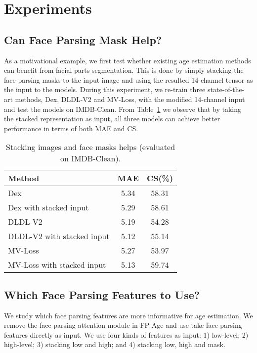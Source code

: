 \section{Experiments}
\subsection{Can Face Parsing Mask Help?}\label{sec:exp:masks}
As a motivational example, we first test whether existing age estimation methods can benefit from facial parts segmentation. This is done by simply stacking the face parsing masks to the input image and using the resulted 14-channel tensor as the input to the models. During this experiment, we re-train three state-of-the-art methods, Dex, DLDL-V2 and MV-Loss, with the modified 14-channel input and test the models on IMDB-Clean. 
From Table~\ref{tab:stack-helps} we observe that by taking the stacked representation as input, all three models can achieve better performance in terms of both MAE and CS.
\begin{table}[h]
\renewcommand{\arraystretch}{1.3}
    \caption{Stacking images and face masks helps (evaluated on IMDB-Clean).}
    \label{tab:stack-helps}
    \centering
    \begin{tabular}{l|c|c}
    \toprule
        Method & MAE  & CS(\%) \\ \hline
        Dex~\cite{rotheDEXDeepEXpectation2015} &5.34 & 58.31 \\ 
        Dex with stacked input &  5.29 & 58.61\\\hline
        DLDL-V2~\cite{gaoAgeEstimationUsing2018} & 5.19  & 54.28 \\
        DLDL-V2 with stacked input & 5.12 & 55.14 \\\hline
        MV-Loss~\cite{panMeanVarianceLossDeep2018} & 5.27 & 53.97 \\
        MV-Loss with stacked input & 5.13 & 59.74 \\
    \bottomrule
    \end{tabular}
\end{table}

\subsection{Which Face Parsing Features to Use?}
We study which face parsing features are more informative for age estimation. 
We remove the face parsing attention module in FP-Age and use take face parsing features directly as input. 
We use four kinds of features as input: 1) low-level; 2) high-level; 3) stacking low and high; and 4) stacking low, high and mask.

